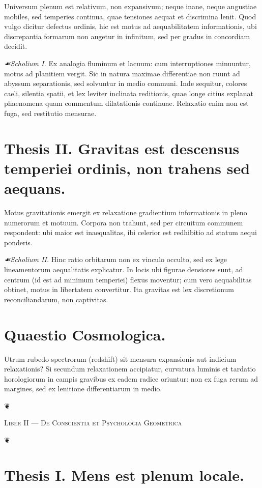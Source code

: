 \documentclass[12pt]{article}
\newcommand{\florale}{\centerline{\large ❦}}
\newcommand{\scholia}{\textit{☙\;}}
\newcommand{\divider}{\vspace{1em}\florale\vspace{1em}}
\newcommand{\Liber}[1]{\vspace{1ex}\begin{center}\Large\textsc{Liber #1}\end{center}\vspace{-0.5ex}\florale\vspace{0.5ex}}
\begin{document}
Universum plenum est relativum, non expansivum; neque inane, neque angustiae mobiles, sed temperies continua, quae tensiones aequat et discrimina lenit. Quod vulgo dicitur defectus ordinis, hic est motus ad aequabilitatem informationis, ubi discrepantia formarum non augetur in infinitum, sed per gradus in concordiam decidit.

\textit{\scholia Scholium I.} Ex analogia fluminum et lacuum: cum interruptiones minuuntur, motus ad planitiem vergit. Sic in natura maximae differentiae non ruunt ad abyssum separationis, sed solvuntur in medio communi. Inde sequitur, colores caeli, silentia spatii, et lex leviter inclinata reditionis, quae longe citius explanat phaenomena quam commentum dilatationis continuae. Relaxatio enim non est fuga, sed restitutio mensurae.

\section*{Thesis II. \; Gravitas est descensus temperiei ordinis, non trahens sed aequans.}

Motus gravitationis emergit ex relaxatione gradientium informationis in pleno numerorum et motuum. Corpora non trahunt, sed per circuitum communem respondent: ubi maior est inaequalitas, ibi celerior est redhibitio ad statum aequi ponderis.

\textit{\scholia Scholium II.} Hinc ratio orbitarum non ex vinculo occulto, sed ex lege lineamentorum aequalitatis explicatur. In locis ubi figurae densiores sunt, ad centrum (id est ad minimum temperiei) flexus moventur; cum vero aequabilitas obtinet, motus in libertatem convertitur. Ita gravitas est lex discretionum reconciliandarum, non captivitas.

\section*{Quaestio Cosmologica.}

Utrum rubedo spectrorum (redshift) sit mensura expansionis aut indicium relaxationis? Si secundum relaxationem accipiatur, curvatura luminis et tardatio horologiorum in campis gravibus ex eadem radice oriuntur: non ex fuga rerum ad margines, sed ex lenitione differentiarum in medio.

\divider

\Liber{II — De Conscientia et Psychologia Geometrica}

\section*{Thesis I. \; Mens est plenum locale.}
\end{document}

